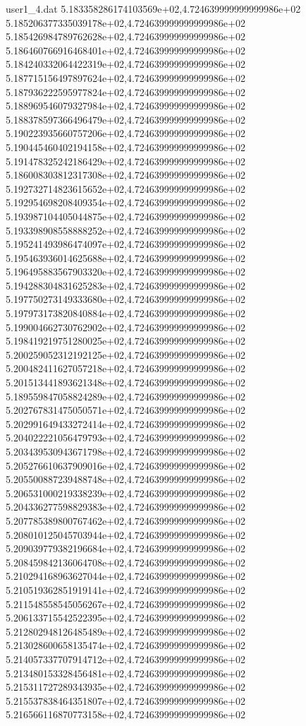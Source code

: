 \begin{filecontents}{user1_4.dat}
5.183358286174103569e+02,4.724639999999999986e+02
5.185206377335039178e+02,4.724639999999999986e+02
5.185426984789762628e+02,4.724639999999999986e+02
5.186460766916468401e+02,4.724639999999999986e+02
5.184240332064422319e+02,4.724639999999999986e+02
5.187715156497897624e+02,4.724639999999999986e+02
5.187936222595977824e+02,4.724639999999999986e+02
5.188969546079327984e+02,4.724639999999999986e+02
5.188378597366496479e+02,4.724639999999999986e+02
5.190223935660757206e+02,4.724639999999999986e+02
5.190445460402194158e+02,4.724639999999999986e+02
5.191478325242186429e+02,4.724639999999999986e+02
5.186008303812317308e+02,4.724639999999999986e+02
5.192732714823615652e+02,4.724639999999999986e+02
5.192954698208409354e+02,4.724639999999999986e+02
5.193987104405044875e+02,4.724639999999999986e+02
5.193398908558888252e+02,4.724639999999999986e+02
5.195241493986474097e+02,4.724639999999999986e+02
5.195463936014625688e+02,4.724639999999999986e+02
5.196495883567903320e+02,4.724639999999999986e+02
5.194288304831625283e+02,4.724639999999999986e+02
5.197750273149333680e+02,4.724639999999999986e+02
5.197973173820840884e+02,4.724639999999999986e+02
5.199004662730762902e+02,4.724639999999999986e+02
5.198419219751280025e+02,4.724639999999999986e+02
5.200259052312192125e+02,4.724639999999999986e+02
5.200482411627057218e+02,4.724639999999999986e+02
5.201513441893621348e+02,4.724639999999999986e+02
5.189559847058824289e+02,4.724639999999999986e+02
5.202767831475050571e+02,4.724639999999999986e+02
5.202991649433272414e+02,4.724639999999999986e+02
5.204022221056479793e+02,4.724639999999999986e+02
5.203439530943671798e+02,4.724639999999999986e+02
5.205276610637909016e+02,4.724639999999999986e+02
5.205500887239488748e+02,4.724639999999999986e+02
5.206531000219338239e+02,4.724639999999999986e+02
5.204336277598829383e+02,4.724639999999999986e+02
5.207785389800767462e+02,4.724639999999999986e+02
5.208010125045703944e+02,4.724639999999999986e+02
5.209039779382196684e+02,4.724639999999999986e+02
5.208459842136064708e+02,4.724639999999999986e+02
5.210294168963627044e+02,4.724639999999999986e+02
5.210519362851919141e+02,4.724639999999999986e+02
5.211548558545056267e+02,4.724639999999999986e+02
5.206133715542522395e+02,4.724639999999999986e+02
5.212802948126485489e+02,4.724639999999999986e+02
5.213028600658135474e+02,4.724639999999999986e+02
5.214057337707914712e+02,4.724639999999999986e+02
5.213480153328456481e+02,4.724639999999999986e+02
5.215311727289343935e+02,4.724639999999999986e+02
5.215537838464351807e+02,4.724639999999999986e+02
5.216566116870773158e+02,4.724639999999999986e+02

\end{filecontents}
